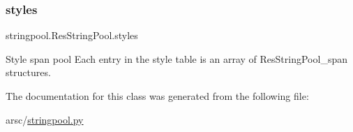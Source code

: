 \subsubsection{\texorpdfstring{styles}{styles}}
{\footnotesize\ttfamily stringpool.\+Res\+String\+Pool.\+styles}



Style span pool Each entry in the style table is an array of Res\+String\+Pool\+\_\+span structures. 



The documentation for this class was generated from the following file\+:\begin{DoxyCompactItemize}
\item 
arsc/\mbox{\hyperlink{stringpool_8py}{stringpool.\+py}}\end{DoxyCompactItemize}
